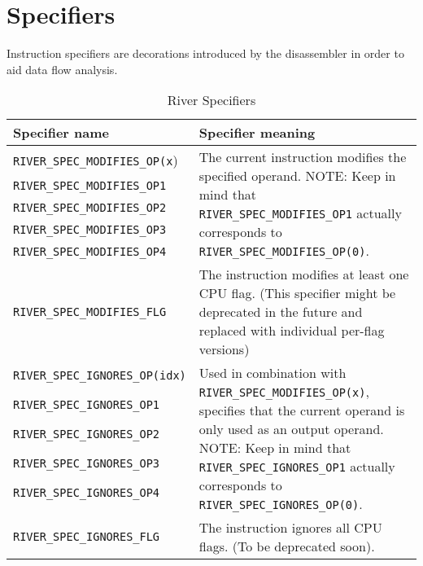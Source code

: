 \documentclass[12pt]{report}
\begin{document}
\section{Specifiers}
\label{sec:specifiers}
Instruction specifiers are decorations introduced by the disassembler in order to aid data flow analysis.\\
\begin{table}[H]
\begin{tabular}{| p{6.3cm} | p{10cm} |}
		\hline
		\textbf{Specifier name} & \textbf{Specifier meaning}\\ \hline
		\texttt{RIVER\_SPEC\_MODIFIES\_OP(x}) & \multirow{5}{10cm}{The current instruction modifies the specified operand. NOTE: Keep in mind that \texttt{RIVER_SPEC_MODIFIES_OP1} actually corresponds to \texttt{RIVER_SPEC_MODIFIES_OP(0)}.}\\
		\texttt{RIVER\_SPEC\_MODIFIES\_OP1} &\\
		\texttt{RIVER\_SPEC\_MODIFIES\_OP2} &\\
		\texttt{RIVER\_SPEC\_MODIFIES\_OP3} &\\
		\texttt{RIVER\_SPEC\_MODIFIES\_OP4} &\\ \hline
		\texttt{RIVER\_SPEC\_MODIFIES\_FLG} & The instruction modifies at least one CPU flag. (This specifier might be deprecated in the future and replaced with individual per-flag versions)\\ \hline
		\texttt{RIVER\_SPEC\_IGNORES\_OP(idx)} & \multirow{6}{10cm}{Used in combination with \texttt{RIVER\_SPEC\_MODIFIES\_OP(x)}, specifies that the current operand is only used as an output operand. NOTE: Keep in mind that \texttt{RIVER\_SPEC\_IGNORES\_OP1} actually corresponds to \texttt{RIVER\_SPEC\_IGNORES\_OP(0)}.} \\
		\texttt{RIVER\_SPEC\_IGNORES\_OP1} &\\
		\texttt{RIVER\_SPEC\_IGNORES\_OP2} &\\
		\texttt{RIVER\_SPEC\_IGNORES\_OP3} &\\
		\texttt{RIVER\_SPEC\_IGNORES\_OP4} &\\
		& \\\hline
		\texttt{RIVER\_SPEC\_IGNORES\_FLG} & The instruction ignores all CPU flags. (To be deprecated soon).\\ \hline
	\end{tabular}
	\caption{River Specifiers}
	\label{table:river-specifiers}
\end{table}
\end{document}
